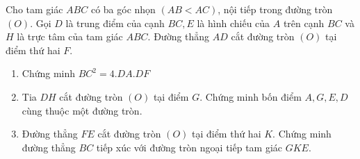 \begin{ex}%
    Cho tam giác $ABC$ có ba góc nhọn $(AB<AC)$, nội tiếp trong đường tròn $(O)$. Gọi $D$ là trung điểm của cạnh $BC,E$ là hình chiếu của $A$ trên cạnh $BC$ và $H$ là trực tâm của tam giác $ABC$. Đường thẳng $AD$ cắt đường tròn $(O)$ tại điểm thứ hai $F$.
    \begin{enumerate}
    \item Chứng minh $BC^2=4.DA.DF$
    \item Tia $DH$ cắt đường tròn $(O)$ tại điểm $G$. Chứng minh bốn điểm $A,G,E,D$ cùng thuộc một đường tròn.
    \item Đường thẳng $FE$ cắt đường tròn $(O)$ tại điểm thứ hai $K$. Chứng minh đường thẳng $BC$ tiếp xúc với đường tròn ngoại tiếp tam giác $GKE$.
\end{enumerate}     
\loigiai
    {
    \begin{center}
\end{center}}
\end{ex}
